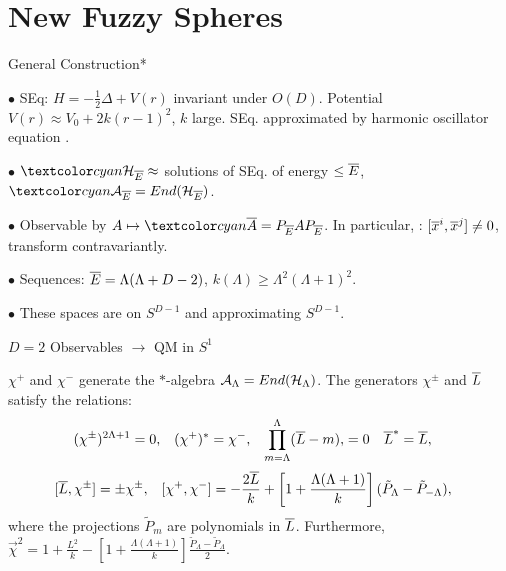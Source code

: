 \section{New Fuzzy Spheres}

\begin{frame}{General Construction*} %
    
    $\bullet$  SEq: $H = - \frac{1}{2} \Delta + V(r)$ invariant under $O(D)$. Potential $V(r) \approx V_0 + 2k(r-1)^2$, $k$ large. SEq. approximated by harmonic oscillator equation \then {}.
    
    $\bullet$ $\lbtext{\hcal_{\cut E}} \approx $ solutions of SEq. of energy $\leq \overline{E}$, $\lbtext{\acal_{\cut E}} = End(\hcal_{\cut E})$.
    
    $\bullet$ Observable by $A \mapsto \lbtext{\cut A} = P_{\cut E} A P_{\cut E}$. In particular, : $[\overline{x}^i, \overline{x}^j] \neq 0$, transform contravariantly.
    
    $\bullet$ Sequences: $\overline{E} = \Lambda(\Lambda + D - 2)$, $k(\Lambda) \geq \Lambda^2 (\Lambda + 1)^2$.
    
    $\bullet$ These spaces are  on $S^{D-1}$ and  approximating $S^{D-1}$.
    
\end{frame}

\begin{frame}{$D = 2$ Observables $\to$ QM in $S^1$} %
    
    $\chi^+$ and $\chi^-$ generate the $*$-algebra $\mathcal A_\Lambda = End(\mathcal H_\Lambda)$. The generators $\chi^\pm$ and $\overline{L}$ satisfy the relations:
\begin{align}\label{equationOperatorFormulaRelationsChiD2}
    (\chi^\pm)^{2\Lambda+1} &= 0, & 
    (\chi^+)^*&= \chi^-, & 
    \prod_{m = \Lambda}^\Lambda (\overline{L} - m), &= 0 & 
    \overline{L}^* &= \overline{L},
\end{align}
\begin{align}\label{equationOperatorFormulaCommutatorsChiD2}
    [\overline{L}, \chi^\pm] &= \pm \chi^\pm,&
    [\chi^+, \chi^-] &= - \frac{2\overline{L}}{k} + \left[ 1 + \frac{\Lambda(\Lambda+1)}{k}\right](\tilde P_\Lambda - \tilde P_{-\Lambda}),
\end{align}
where the projections $\tilde P_m$ are polynomials in $\overline{L}$. Furthermore,
$\label{equationOperatorFormulaRChiD2}
    \vec \chi^2 = 1 + \frac{L^2}{k} - \left[ 1 + \frac{\Lambda(\Lambda+1)}{k}\right]\frac{\tilde P_\Lambda - \tilde P_\Lambda}{2}.
$

\end{frame}

